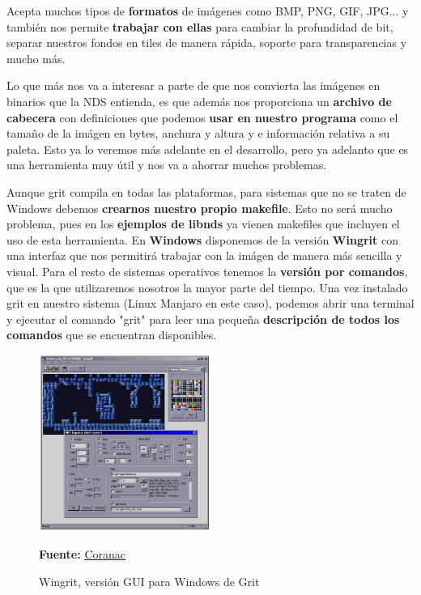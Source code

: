 \vspace{0.5cm}

Acepta muchos tipos de \textbf{formatos} de imágenes como BMP, PNG, GIF, JPG... y también nos permite \textbf{trabajar con ellas} para cambiar la profundidad de bit, separar nuestros fondos en tiles de manera rápida, soporte para transparencias y mucho más. 

\vspace{0.5cm}

Lo que más nos va a interesar a parte de que nos convierta las imágenes en binarios que la NDS entienda, es que además nos proporciona un \textbf{archivo de cabecera} con definiciones que podemos \textbf{usar en nuestro programa} como el tamaño de la imágen en bytes, anchura y altura y e información relativa a su paleta. Esto ya lo veremos más adelante en el desarrollo, pero ya adelanto que es una herramienta muy útil y nos va a ahorrar muchos problemas.

\vspace{0.5cm}

 Aunque grit compila en todas las plataformas, para sistemas que no se traten de Windows debemos \textbf{crearnos nuestro propio makefile}. Esto no será mucho problema, pues en los \textbf{ejemplos de libnds} ya vienen makefiles que incluyen el uso de esta herramienta. En \textbf{Windows} disponemos de la versión \textbf{Wingrit} con una interfaz que nos permitirá trabajar con la imágen de manera más sencilla y visual. Para el resto de sistemas operativos tenemos la \textbf{versión por comandos}, que es la que utilizaremos nosotros la mayor parte del tiempo. Una vez instalado grit en nuestro sistema (Linux Manjaro en este caso), podemos abrir una terminal y ejecutar el comando "grit" para leer una pequeña \textbf{descripción de todos los comandos} que se encuentran disponibles.
 
 \begin{figure}[htbp]
\centering
  \includegraphics[width=0.5\textwidth]{archivos/wingrit.png}
  \caption{Wingrit, versión GUI para Windows de Grit}
\textbf{Fuente:} \href{https://www.coranac.com/man/grit/html/wingrit.htm}{Coranac}
  \label{fig:wingrit}
\end{figure}

